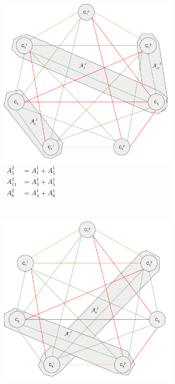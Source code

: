 \begin{figure}
\begin{subfigure}[b]{\sfwidth}
    \includegraphics[width=\textwidth]{img/split-2-class_3.png}
    \caption[caption]{$\begin{aligned}
              A_5^2    &= A_1^1 + A_5^1\\
              A_{11}^2 &= A_3^1 + A_5^1\\
              A_6^2    &= A_4^1 + A_6^1
             \end{aligned}$}
  \end{subfigure}
\\
  \begin{subfigure}[b]{\sfwidth}
    \includegraphics[width=\textwidth]{img/split-2-class_4.png}

\end{subfigure}
\end{figure}

